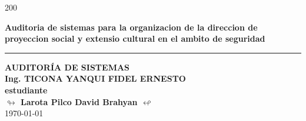 \begin{titlepage}
\begin{textblock}{200}
\begin{center}
            \vspace*{\fill}
                \begin{minipage}{0.9\textwidth}
                    \centering
                    {\Large {\textbf{Auditoria de sistemas para la organizacion de la direccion de proyeccion social y extensio cultural en el ambito de seguridad}}}\par
                \end{minipage}
            \vspace*{\fill}
            \textcolor{azul}{\rule{0.5\linewidth}{0.80mm}} \par
            \vspace{8mm}
            {\large{\textbf{ AUDITORÍA DE SISTEMAS }}} \\[10pt]
            {\large{\textbf{\textcolor{azul}{Ing. TICONA YANQUI FIDEL ERNESTO }}}} \\[20pt]
            {\large{\textbf{estudiante}}}\\[10pt]
            {\large{\textbf{$\looparrowright$   Larota Pilco David Brahyan  $\looparrowleft$ }}}\\[5pt]
            \today

        \end{center}
    \end{textblock}
\end{titlepage}
%
%
%
